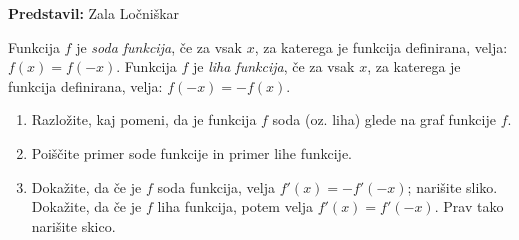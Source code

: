 \textbf{Predstavil:} Zala Ločniškar

Funkcija $f$ je \emph{soda funkcija}, če za vsak $x$, za katerega je funkcija definirana, velja: $f(x) = f(-x)$. Funkcija $f$ je \emph{liha funkcija}, če za vsak $x$, za katerega je funkcija definirana, velja: $f(-x) = -f(x)$.
\begin{enumerate}
	\item Razložite, kaj pomeni, da je funkcija $f$ soda (oz. liha) glede na graf funkcije $f$.
	\item Poiščite primer sode funkcije in primer lihe funkcije.
	\item Dokažite, da če je $f$ soda funkcija, velja $f'(x) = -f'(-x)$; narišite sliko. Dokažite, da če je $f$ liha funkcija, potem velja \( f'(x) = f'(-x) \). Prav tako narišite skico.
\end{enumerate}